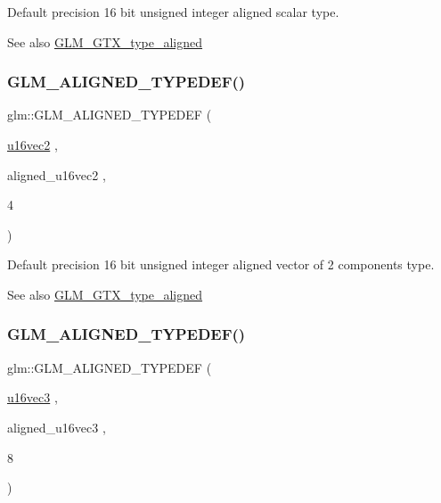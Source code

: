 Default precision 16 bit unsigned integer aligned scalar type. \begin{DoxySeeAlso}{See also}
\mbox{\hyperlink{group__gtx__type__aligned}{G\+L\+M\+\_\+\+G\+T\+X\+\_\+type\+\_\+aligned}} 
\end{DoxySeeAlso}
\mbox{\label{group__gtx__type__aligned_gac01bb9fc32a1cd76c2b80d030f71df4c}} 
\subsubsection{\texorpdfstring{GLM\_ALIGNED\_TYPEDEF()}{GLM\_ALIGNED\_TYPEDEF()}\hspace{0.1cm}{\footnotesize\ttfamily [126/209]}}
{\footnotesize\ttfamily glm\+::\+G\+L\+M\+\_\+\+A\+L\+I\+G\+N\+E\+D\+\_\+\+T\+Y\+P\+E\+D\+EF (\begin{DoxyParamCaption}\item[{\mbox{\hyperlink{group__gtc__type__precision_ga10e8900b9610f930772aa55aee8e3121}{u16vec2}}}]{,  }\item[{aligned\+\_\+u16vec2}]{,  }\item[{4}]{ }\end{DoxyParamCaption})}

Default precision 16 bit unsigned integer aligned vector of 2 components type. \begin{DoxySeeAlso}{See also}
\mbox{\hyperlink{group__gtx__type__aligned}{G\+L\+M\+\_\+\+G\+T\+X\+\_\+type\+\_\+aligned}} 
\end{DoxySeeAlso}
\mbox{\label{group__gtx__type__aligned_ga09540dbca093793a36a8997e0d4bee77}} 
\subsubsection{\texorpdfstring{GLM\_ALIGNED\_TYPEDEF()}{GLM\_ALIGNED\_TYPEDEF()}\hspace{0.1cm}{\footnotesize\ttfamily [127/209]}}
{\footnotesize\ttfamily glm\+::\+G\+L\+M\+\_\+\+A\+L\+I\+G\+N\+E\+D\+\_\+\+T\+Y\+P\+E\+D\+EF (\begin{DoxyParamCaption}\item[{\mbox{\hyperlink{group__gtc__type__precision_ga947d0d003e016eaf2038d6843b427257}{u16vec3}}}]{,  }\item[{aligned\+\_\+u16vec3}]{,  }\item[{8}]{ }\end{DoxyParamCaption})}

